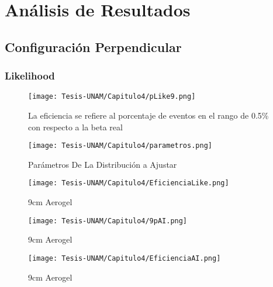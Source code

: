 \chapter{Análisis de Resultados}



\section{Configuración Perpendicular}
\subsection{Likelihood}
\begin{figure}
    \centering
    \texttt{[image: Tesis-UNAM/Capitulo4/pLike9.png]}
    \caption{La eficiencia se refiere al porcentaje de eventos en el rango de 0.5\% con respecto a la beta real}
    \label{fig:enter-label}
\end{figure}


\begin{figure}
    \centering
    \texttt{[image: Tesis-UNAM/Capitulo4/parametros.png]}
    \caption{Parámetros De La Distribución a Ajustar}
    \label{fig:enter-label}
\end{figure}

\begin{figure}
    \centering
    \texttt{[image: Tesis-UNAM/Capitulo4/EficienciaLike.png]}
    \caption{9cm Aerogel}
    \label{fig:enter-label}
\end{figure}

\begin{figure}
    \centering
    \texttt{[image: Tesis-UNAM/Capitulo4/9pAI.png]}
    \caption{9cm Aerogel}
    \label{fig:enter-label}
\end{figure}

\begin{figure}
    \centering
    \texttt{[image: Tesis-UNAM/Capitulo4/EficienciaAI.png]}
    \caption{9cm Aerogel}
    \label{fig:enter-label}
\end{figure}
